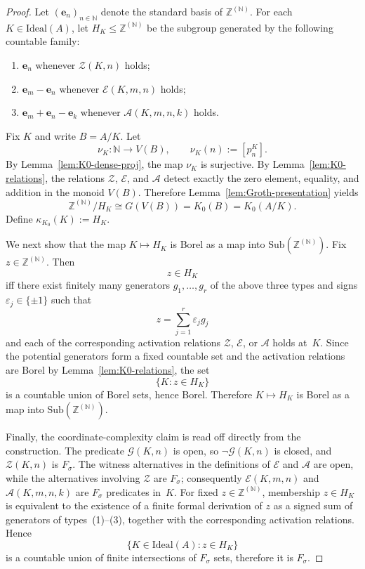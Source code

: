 \documentclass[12pt,fleqn,a4paper]{amsart}
\renewcommand{\le}{\leqslant}
\numberwithin{equation}{section}
\theoremstyle{definition}
\newcommand{\N}{\mathbb{N}}
\newcommand{\Z}{\mathbb{Z}}
\newcommand{\Ideal}{\mathrm{Ideal}}
\newcommand{\Sub}{\mathrm{Sub}}
\begin{document}
\begin{proof}
Let $(\mathbf e_n)_{n\in\N}$ denote the standard basis of $\Z^{(\N)}$.
For each $K\in\Ideal(A)$, let $H_K\le \Z^{(\N)}$ be the subgroup generated by the
following countable family:

\begin{enumerate}
\item $\mathbf e_n$ whenever $\mathcal Z(K,n)$ holds;
\item $\mathbf e_m-\mathbf e_n$ whenever $\mathcal E(K,m,n)$ holds;
\item $\mathbf e_m+\mathbf e_n-\mathbf e_k$ whenever $\mathcal A(K,m,n,k)$ holds.
\end{enumerate}

Fix $K$ and write $B=A/K$.
Let
\[
\nu_K:\N\to V(B),\qquad \nu_K(n):=[p_n^K].
\]
By Lemma~\ref{lem:K0-dense-proj}, the map $\nu_K$ is surjective.
By Lemma~\ref{lem:K0-relations}, the relations $\mathcal Z$, $\mathcal E$, and
$\mathcal A$ detect exactly the zero element, equality, and addition in the monoid
$V(B)$.
Therefore Lemma~\ref{lem:Groth-presentation} yields
\[
\Z^{(\N)}/H_K\cong G(V(B))=K_0(B)=K_0(A/K).
\]
Define $\kappa_{K_0}(K):=H_K$.

We next show that the map $K\mapsto H_K$ is Borel as a map into
$\Sub(\Z^{(\N)})$.
Fix $z\in\Z^{(\N)}$.  Then
\[
z\in H_K
\]
iff there exist finitely many generators $g_1,\dots,g_r$ of the above three types and
signs $\varepsilon_j\in\{\pm1\}$ such that
\[
z=\sum_{j=1}^{r}\varepsilon_j g_j
\]
and each of the corresponding activation relations $\mathcal Z$, $\mathcal E$, or
$\mathcal A$ holds at~$K$.
Since the potential generators form a fixed countable set and the activation relations are
Borel by Lemma~\ref{lem:K0-relations}, the set
\[
\{K:z\in H_K\}
\]
is a countable union of Borel sets, hence Borel.
Therefore $K\mapsto H_K$ is Borel as a map into $\Sub(\Z^{(\N)})$.

Finally, the coordinate-complexity claim is read off directly from the construction.
The predicate $\mathcal G(K,n)$ is open, so $\neg\mathcal G(K,n)$ is closed, and
$\mathcal Z(K,n)$ is $F_\sigma$.  The witness alternatives in the definitions of
$\mathcal E$ and $\mathcal A$ are open, while the alternatives involving
$\mathcal Z$ are $F_\sigma$; consequently $\mathcal E(K,m,n)$ and
$\mathcal A(K,m,n,k)$ are $F_\sigma$ predicates in~$K$.
For fixed $z\in\Z^{(\N)}$, membership $z\in H_K$ is equivalent to the existence of a
finite formal derivation of $z$ as a signed sum of generators of types~\textup{(1)}--\textup{(3)},
together with the corresponding activation relations.
Hence
\[
\{K\in\Ideal(A): z\in H_K\}
\]
is a countable union of finite intersections of $F_\sigma$ sets, therefore it is
$F_\sigma$.
\end{proof}
\end{document}
